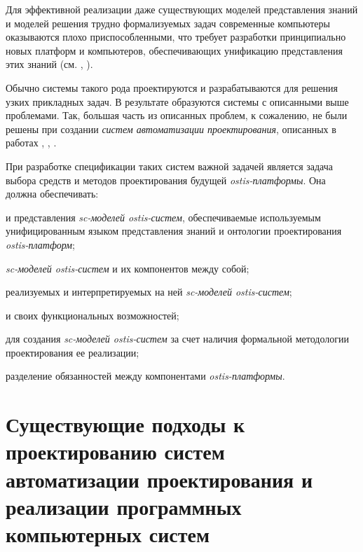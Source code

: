 \begin{textitemize}
   \item Для эффективной реализации даже существующих моделей представления знаний и моделей решения трудно формализуемых задач современные компьютеры оказываются плохо приспособленными, что требует разработки принципиально новых платформ и компьютеров, обеспечивающих унификацию представления этих знаний (см. , ).
\end{textitemize}

Обычно системы такого рода проектируются и разрабатываются для решения узких прикладных задач. В результате образуются системы с описанными выше проблемами. Так, большая часть из описанных проблем, к сожалению, не были решены при создании \textit{систем автоматизации проектирования}, описанных в работах , , .

При разработке спецификации таких систем важной задачей является задача выбора средств и методов проектирования будущей \textit{ostis-платформы}. Она должна обеспечивать:

\begin{textitemize}
    \item {} и представления \textit{sc-моделей ostis-систем}, обеспечиваемые используемым унифицированным языком представления знаний и онтологии проектирования \textit{ostis-платформ};
    \item {} \textit{sc-моделей ostis-систем} и их компонентов между собой;
    \item {} реализуемых и интерпретируемых на ней \textit{sc-моделей ostis-систем};
    \item {} и  своих функциональных возможностей;
    \item {} для создания \textit{sc-моделей ostis-систем} за счет наличия формальной методологии проектирования ее реализации;
    \item разделение обязанностей между компонентами \textit{ostis-платформы}.
\end{textitemize}

\section{Существующие подходы к проектированию систем автоматизации проектирования и реализации программных компьютерных систем}
\label{sec_soft_platform_problems}

